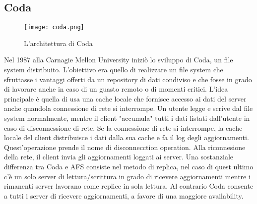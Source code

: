 \subsection{Coda}
\begin{figure}[ht]
  \begin{center}
    \texttt{[image: coda.png]}
    \caption{L'architettura di Coda}
    \label{coda}
  \end{center}
\end{figure}
Nel 1987 alla Carnagie Mellon University iniziò lo sviluppo di Coda, un file system distribuito. L'obiettivo era quello di realizzare un file system che sfruttasse i vantaggi offerti da un repository di dati condiviso e che fosse in grado di lavorare anche in caso di un guasto remoto o di momenti critici. L'idea principale è quella di usa una cache locale che fornisce accesso ai dati del server anche quandola connessione di rete si interrompe. Un utente legge e scrive dal file system normalmente, mentre il client "accumula" tutti i dati listati dall'utente in caso di disconnessione di rete.
Se la connessione di rete si interrompe, la cache locale del client distribuisce i dati dalla sua cache e fa il log degli aggiornamenti. Quest'operazione prende il nome di disconnecction operation. Alla riconnesione della rete, il client invia gli aggiornamenti loggati ai server. Una sostanziale differenza tra Coda e AFS consiste nel metodo di replica, nel caso di quest ultimo c'è un solo server di lettura/scrittura in grado di ricevere aggiornamenti mentre i rimanenti server lavorano come replice in sola lettura. Al contrario Coda consente a tutti i server di ricevere aggiornamenti, a favore di una maggiore availability.\cite{kistler92}
